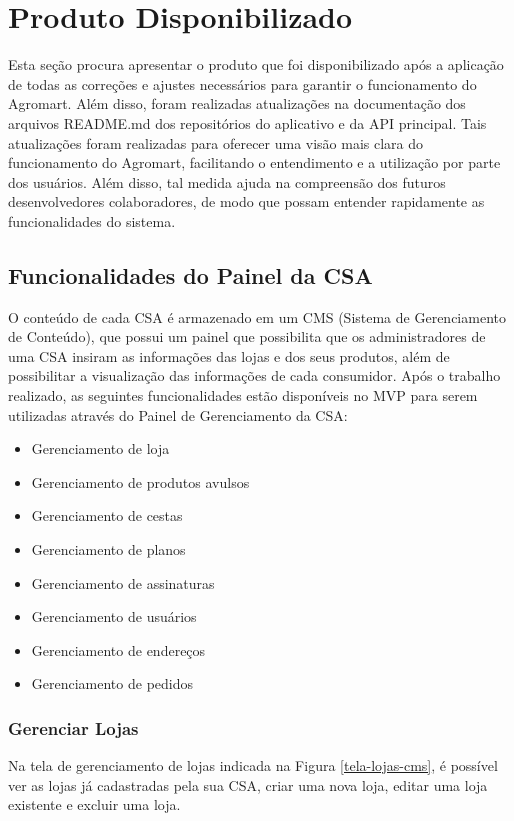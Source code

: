 \chapter[Produto Disponibilizado]{Produto Disponibilizado}
Esta seção procura apresentar o produto que foi disponibilizado após a aplicação de todas as correções e ajustes necessários para garantir o funcionamento do Agromart. Além disso, foram realizadas atualizações na documentação dos arquivos README.md dos repositórios do aplicativo e da API principal. Tais atualizações foram realizadas para oferecer uma visão mais clara do funcionamento do Agromart, facilitando o entendimento e a utilização por parte dos usuários. Além disso, tal medida ajuda na compreensão dos futuros desenvolvedores colaboradores, de modo que possam entender rapidamente as funcionalidades do sistema. 

\section{Funcionalidades do Painel da CSA}
O conteúdo de cada CSA é armazenado em um CMS (Sistema de Gerenciamento de Conteúdo), que possui um painel que possibilita que os administradores de uma CSA insiram as informações das lojas e dos seus produtos, além de possibilitar a visualização das informações de cada consumidor. Após o trabalho realizado, as seguintes funcionalidades estão disponíveis no MVP para serem utilizadas através do Painel de Gerenciamento da CSA:

\begin{itemize}
    \item Gerenciamento de loja
    \item Gerenciamento de produtos avulsos
    \item Gerenciamento de cestas
    \item Gerenciamento de planos
    \item Gerenciamento de assinaturas
    \item Gerenciamento de usuários
    \item Gerenciamento de endereços
    \item Gerenciamento de pedidos
\end{itemize}

\subsection{Gerenciar Lojas}
Na tela de gerenciamento de lojas indicada na Figura \ref{tela-lojas-cms}, é possível ver as lojas já cadastradas pela sua CSA, criar uma nova loja, editar uma loja existente e excluir uma loja.

